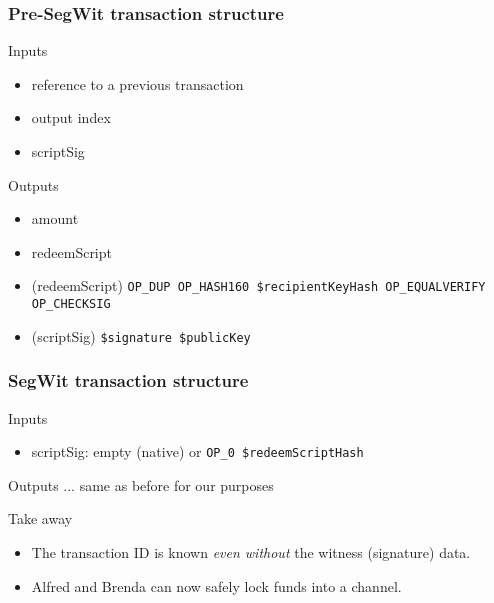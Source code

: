 \documentclass{beamer}
\begin{document}
\begin{frame}
	\frametitle{Pre-SegWit transaction structure}
	\begin{block}{Inputs}
		\begin{itemize}
			\item reference to a previous transaction \pause
			\item output index \pause
			\item scriptSig \pause
		\end{itemize}
	\end{block}
	\begin{block}{Outputs}
		\begin{itemize}
			\item amount \pause
			\item redeemScript \pause 
		\end{itemize}
	\end{block}
	\begin{example}[P2KH script]
		\begin{itemize}
			\item (redeemScript) {\tiny \texttt{OP\_DUP OP\_HASH160 \$recipientKeyHash OP\_EQUALVERIFY OP\_CHECKSIG}}
			\item (scriptSig) {\tiny\texttt{\$signature \$publicKey}}
		\end{itemize}
	\end{example}
\end{frame}
\begin{frame}
	\frametitle{SegWit transaction structure}
	\begin{block}{Inputs} 
		\begin{itemize}
			\item scriptSig: empty (native) or {\tiny \texttt{OP\_0 \$redeemScriptHash}} \pause
		\end{itemize}
	\end{block}
	\begin{block}{Outputs}
		... same as before for our purposes \pause
	\end{block}
	\begin{block}{Take away}
		\begin{itemize}
			\item The transaction ID is known \emph{even without} the witness (signature) data. \pause
			\item Alfred and Brenda can now safely lock funds into a channel.
		\end{itemize}
	\end{block}
\end{frame}
\end{document}
